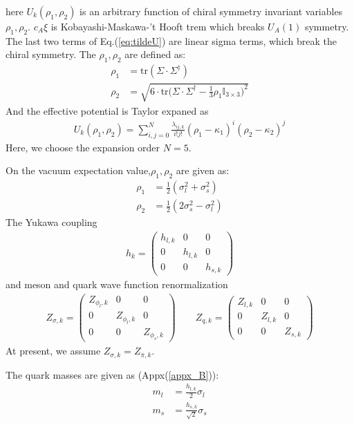 \documentclass[12pt]{article}
\begin{document}
here $U_k(\rho_1,\rho_2)$ is an arbitrary function of chiral symmetry invariant variables $\rho_1,\rho_2$.  $ c_A \xi$ is Kobayashi-Maskawa-’t Hooft trem which breaks $U_A(1)$ symmetry. The last two terms of Eq.(\ref{eq:tildeU}) are linear sigma terms, which break the chiral symmetry. The $\rho_1,\rho_2$ are defined as:
\begin{align}
\rho_1&=\text{tr}(\Sigma \cdot \Sigma ^\dagger) \\
\rho_2&=\sqrt{6 \cdot \text{tr}\bigg (\Sigma \cdot \Sigma ^\dagger-\frac{1}{3} \rho_1 \mathbb{I}_{3 \times 3} \bigg )^2 }
\end{align}
And the effective potential is Taylor expaned as
\begin{align}
U_{k} (\rho_1,\rho_2)=\sum_{i,j=0}^N \frac{\lambda_{ij,k}}{i!j!}(\rho_1 -\kappa_1)^i(\rho_2-\kappa_2)^j
\end{align}
Here, we choose the expansion order $N=5$.

On the vacuum expectation value,$\rho_1,\rho_2$ are given as:
\begin{align}
\rho_1&=\frac{1}{2}(\sigma_l^2+\sigma_s^2)\\
\rho_2&=\frac{1}{2}(2 \sigma_s^2-\sigma_l^2)
\end{align}
The Yukawa coupling 
\begin{align}
h_k=\begin{pmatrix} 
h_{l,k}&0&0\\
0&h_{l,k}&0\\
0&0&h_{s,k}
\end{pmatrix}
\end{align}
and meson and quark wave function renormalization
\begin{align}
Z_{\sigma,k}=\begin{pmatrix} 
Z_{\phi_l,k}&0&0\\
0&Z_{\phi_l,k}&0\\
0&0&Z_{\phi_s,k}
\end{pmatrix} 
\quad \quad
Z_{q,k}=\begin{pmatrix} 
Z_{l,k}&0&0\\
0&Z_{l,k}&0\\
0&0&Z_{s,k}
\end{pmatrix} 
\end{align}
At present, we assume $Z_{\sigma,k}=Z_{\pi,k}$.

The quark masses are given as (Appx(\ref{appx_B})):
 \begin{align}\label{quarkmass_eq}
m_l&=\frac{h_{l,k}}{2}\sigma_l \\
m_s&=\frac{h_{s,k}}{\sqrt{2}}\sigma_s
\end{align}
\end{document}
